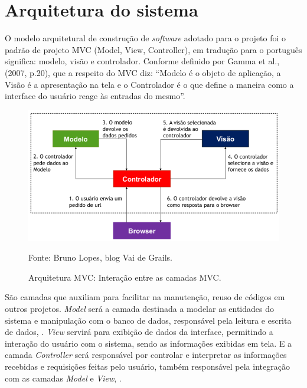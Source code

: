 \documentclass[
	12pt,				%
	openright,			%
	oneside,			%
	a4paper,			%
	english,			%
	french,				%
	spanish,			%
	brazil,				%
	]{abntex2}
\begin{document}
\section{Arquitetura do sistema}

O modelo arquitetural de construção de \textit{software} adotado para o projeto foi o padrão de projeto MVC (Model, View, Controller), em tradução para o português significa: modelo, visão e controlador. Conforme definido por Gamma et al., (2007, p.20), que a respeito do MVC diz:  “Modelo é o objeto de aplicação, a Visão é a apresentação na tela e o Controlador é o que define a maneira como a interface do usuário reage às entradas do mesmo”.

\begin{figure}[ht]
    \centering
    \caption{Arquitetura MVC: Interação entre as camadas MVC.}
    \includegraphics[width=5.0in]{Images/18MVC.png}
    \label{fig: grafico-acc}
    
    \centering \small Fonte: Bruno Lopes, blog Vai de Grails.
\end{figure}

São camadas que auxiliam para facilitar na manutenção, reuso de códigos em outros projetos. \textit{Model} será a camada destinada a modelar as entidades do sistema e manipulação com o banco de dados, responsável pela leitura e escrita de dados, \cite{Gamma2007}. \textit{View} servirá para exibição de dados da interface, permitindo a interação do usuário com o sistema, sendo as informações exibidas em tela. E a camada \textit{Controller} será responsável por controlar e interpretar as informações recebidas e requisições feitas pelo usuário, também responsável pela integração com as camadas \textit{Model} e \textit{View}, \cite{Wazlawick2013}.
\end{document}
